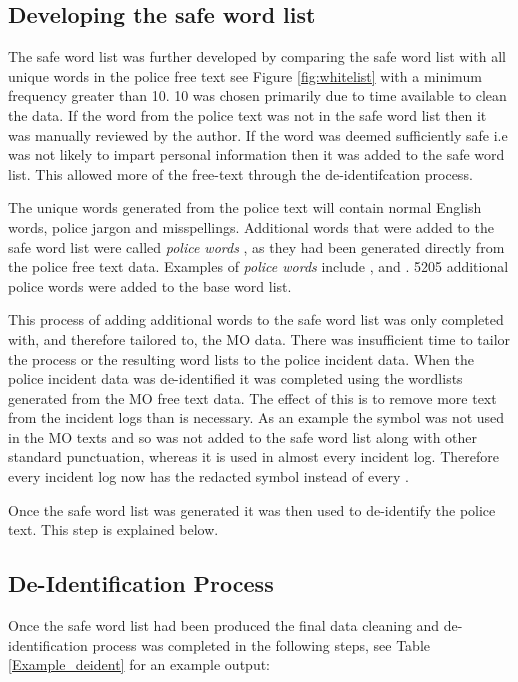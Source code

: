 \subsection{Developing the safe word list} The safe word list was further developed by comparing the safe word list with all unique words in the police free text see Figure \ref{fig:whitelist} with a minimum frequency greater than 10. 10 was chosen primarily due to time available to clean the data. If the word from the police text was not in the safe word list then it was manually reviewed by the author.  If the word was deemed sufficiently safe i.e was not likely to impart personal information then it was added to the safe word list.  This allowed more of the free-text through the de-identifcation process.

The unique words generated from the police text will contain normal English words, police jargon and misspellings. Additional words that were added to the safe word list were called \emph{police words} , as they had been generated directly from the police free text data. Examples of \emph{police words}  include ,  and . 5205 additional police words were added to the base word list.

This process of adding additional words to the safe word list was only completed with, and therefore tailored to, the MO data. There was insufficient time to tailor the process or the resulting word lists to the police incident data. When the police incident data was de-identified it was completed using the wordlists generated from the MO free text data. The effect of this is to remove more text from the incident logs than is necessary. As an example the \say{:} symbol was not used in the MO texts and so was not added to the safe word list along with other standard punctuation, whereas it is used in almost every incident log. Therefore every incident log now has the redacted symbol  instead of every \say{:}.

Once the safe word list was generated it was then used to de-identify the police text. This step is explained below.


\subsection{De-Identification Process} Once the safe word list had been produced the final data cleaning and de-identification process was completed in the following steps, see Table \ref{Example_deident} for an example output:


